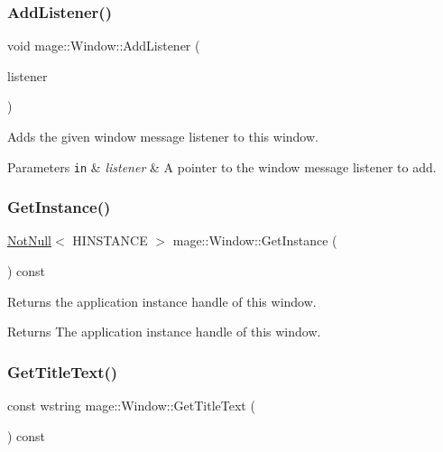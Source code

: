 \subsubsection{\texorpdfstring{Add\+Listener()}{AddListener()}}
{\footnotesize\ttfamily void mage\+::\+Window\+::\+Add\+Listener (\begin{DoxyParamCaption}\item[{\mbox{\hyperlink{classmage_1_1_window_a0e0a4f2a3f6db176f6aec454b94a06fb}{Window\+Message\+Listener\+Ptr}}}]{listener }\end{DoxyParamCaption})}

Adds the given window message listener to this window.


\begin{DoxyParams}[1]{Parameters}
\mbox{\tt in}  & {\em listener} & A pointer to the window message listener to add. \\
\hline
\end{DoxyParams}
\mbox{\label{classmage_1_1_window_a809eff149af9fd2e66eec176078d0127}} 
\subsubsection{\texorpdfstring{Get\+Instance()}{GetInstance()}}
{\footnotesize\ttfamily \mbox{\hyperlink{namespacemage_a8769f9d670d6b585ea306cb1062af94b}{Not\+Null}}$<$ H\+I\+N\+S\+T\+A\+N\+CE $>$ mage\+::\+Window\+::\+Get\+Instance (\begin{DoxyParamCaption}{ }\end{DoxyParamCaption}) const\hspace{0.3cm}{\ttfamily [noexcept]}}

Returns the application instance handle of this window.

\begin{DoxyReturn}{Returns}
The application instance handle of this window. 
\end{DoxyReturn}
\mbox{\label{classmage_1_1_window_a62bf5cd2d9dbdf53947cec3cccee04db}} 
\subsubsection{\texorpdfstring{Get\+Title\+Text()}{GetTitleText()}}
{\footnotesize\ttfamily const wstring mage\+::\+Window\+::\+Get\+Title\+Text (\begin{DoxyParamCaption}{ }\end{DoxyParamCaption}) const\hspace{0.3cm}{\ttfamily [noexcept]}}

